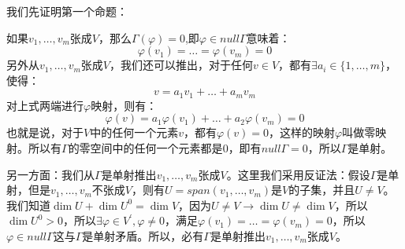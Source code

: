 \documentclass[10pt,a4paper,UTF8]{article}
\begin{document}
\begin{answer}
我们先证明第一个命题：

如果\(v_{1},\ldots ,v_{m}\)张成\(V\)，那么\(\Gamma(\varphi) = 0\),即\(\varphi\in null \Gamma\)意味着：\[\varphi(v_{1}) = \ldots = \varphi(v_{m}) = 0\]
另外从\(v_{1},\ldots ,v_{m}\)张成\(V\)，我们还可以推出，对于任何\(v\in V\)，都有\(\exists a_{i}\in \{1,\ldots ,m\}\)，使得：\[v= a_{1}v_{1}+\ldots + a_{m}v_{m}\]对上式两端进行\(\varphi\)映射，则有：
\begin{equation}
\label{eq:2}
\varphi(v) = a_{1}\varphi(v_{1}) + \ldots + a_{2}\varphi(v_{m}) = 0
\end{equation}
也就是说，对于\(V\)中的任何一个元素\(v\)，都有\(\varphi(v) = 0\)，这样的映射\(\varphi\)叫做零映射。所以有\(\Gamma\)的零空间中的任何一个元素都是\(0\)，即有\(null\Gamma = 0\)，所以\(\Gamma\)是单射。

另一方面：我们从\(\Gamma\)是单射推出\(v_{1},\ldots ,v_{m}\)张成\(V\)。这里我们采用反证法：假设\(\Gamma\)是单射，但是\(v_{1},\ldots ,v_{m}\)不张成\(V\)，则有\(U = span(v_{1},\ldots ,v_{m})\)是\(V\)的子集，并且\(U\neq V\)。我们知道\(\dim U + \dim U^{0} = \dim V\)，因为\(U\neq V \rightarrow \dim U \neq \dim V\)，所以\(\dim U^{0} > 0\)，所以\(\exists \varphi \in V^{'},\varphi\neq 0\)，满足\(\varphi(v_{1}) = \ldots =\varphi(v_{m}) = 0\)，所以\(\varphi \in null \Gamma\)这与\(\Gamma\)是单射矛盾。所以，必有\(\Gamma\)是单射推出\(v_{1},\ldots ,v_{m}\)张成\(V\)。
\end{answer}
\end{document}
